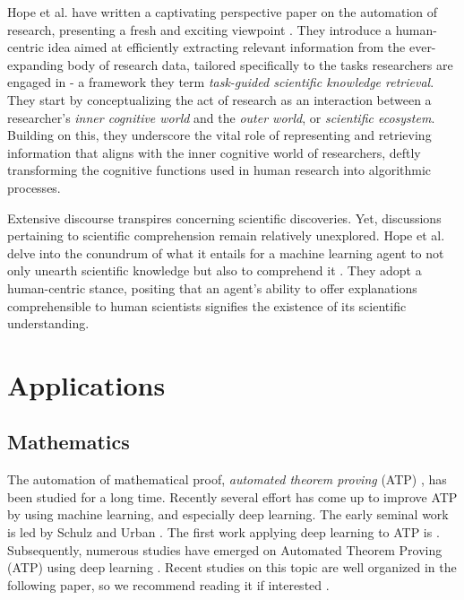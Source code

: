 \documentclass{book}
\begin{document}
Hope et al. have written a captivating perspective paper on the automation of research, presenting a fresh and exciting viewpoint \cite{hope2022computational}. They introduce a human-centric idea aimed at efficiently extracting relevant information from the ever-expanding body of research data, tailored specifically to the tasks researchers are engaged in - a framework they term \textit{task-guided scientific knowledge retrieval}. They start by conceptualizing the act of research as an interaction between a researcher's \textit{inner cognitive world} and the \textit{outer world}, or \textit{scientific ecosystem}. Building on this, they underscore the vital role of representing and retrieving information that aligns with the inner cognitive world of researchers, deftly transforming the cognitive functions used in human research into algorithmic processes.

Extensive discourse transpires concerning scientific discoveries. Yet, discussions pertaining to scientific comprehension remain relatively unexplored. Hope et al. delve into the conundrum of what it entails for a machine learning agent to not only unearth scientific knowledge but also to comprehend it \cite{krenn2022scientific}. They adopt a human-centric stance, positing that an agent's ability to offer explanations comprehensible to human scientists signifies the existence of its scientific understanding.

\section{Applications}

\subsection{Mathematics}
The automation of mathematical proof, \textit{automated theorem proving} (ATP) , has been studied for a long time. Recently several effort has come up to improve ATP by using machine learning, and especially deep learning. The 
 early seminal work is led by Schulz \cite{schulz2001learning} and Urban \cite{urban2004mptp,urban2008malarea}. The first work applying deep learning to ATP is \cite{irving2016deepmath}. Subsequently, numerous studies have emerged on Automated Theorem Proving (ATP) using deep learning \cite{bansal2019holist}. Recent studies on this topic are well organized in the following paper, so we recommend reading it if interested \cite{rabe2021towards}.
\end{document}
